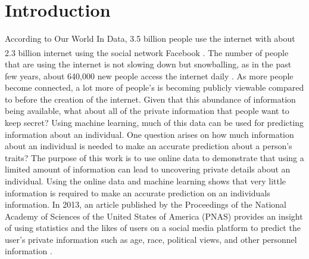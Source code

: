 \documentclass[a4paper, 12pt]{article}
\begin{document}
\section{Introduction}
\begin{paragraph}
\indent According to Our World In Data, 3.5 billion people use the internet with about 2.3 billion internet using the social network Facebook\textsuperscript{\textregistered} \cite{IntStats}. The number of people that are using the internet is not slowing down but snowballing, as in the past few years, about 640,000 new people access the internet daily \cite{IntStats}. As more people become connected, a lot more of people's  is becoming publicly viewable compared to before the creation of the internet. Given that this abundance of information being available, what about all of the private information that people want to keep secret? Using machine learning, much of this data can be used for predicting information about an individual. One question arises on how much information about an individual is needed to make an accurate prediction about a person's traits? The purpose of this work is to use online data to demonstrate that using a limited amount of information can lead to uncovering private details about an individual. Using the online data and machine learning shows that very little information is required to make an accurate prediction on an individuals information. In 2013, an article published by the Proceedings of the National Academy of Sciences of the United States of America (PNAS) provides an insight of using statistics and the likes of users on a social media platform to predict the user's private information such as age, race, political views, and other personnel information \cite{Kosinski2013}.
\end{paragraph}
\end{document}
